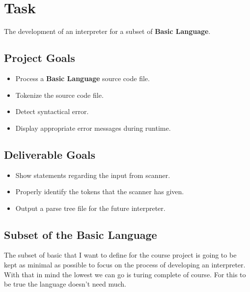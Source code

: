 \documentclass{report}
\begin{document}


\section*{Task}
The development of an interpreter for a subset of \textbf{Basic Language}. 

\vspace{0.5cm}

\subsection*{Project Goals}
\begin{itemize}
	\item Process a \textbf{Basic Language} source code file. 
	\item Tokenize the source code file. 
	\item Detect syntactical error.
	\item Display appropriate error messages during runtime. 
\end{itemize}

\subsection*{Deliverable Goals}
\begin{itemize}
	\item Show statements regarding the input from scanner.
	\item Properly identify the tokens that the scanner has given.
	\item Output a parse tree file for the future interpreter.
\end{itemize}

\subsection*{Subset of the Basic Language}
The subset of basic that I want to define for the course project is going to be kept as minimal as possible to focus on the process of developing an interpreter. 
With that in mind the lowest we can go is turing complete of course. 
For this to be true the language doesn't need much. 
\end{document}
